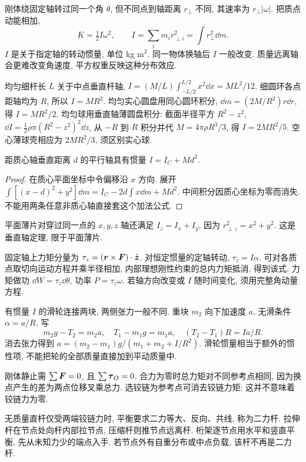\label{ch:rotation}
刚体绕固定轴转过同一个角 $\theta$, 但不同点到轴距离 $r_\perp$ 不同, 其速率为 $r_\perp|\omega|$. 把质点动能相加,
\begin{equation}
K=\tfrac12 I\omega^2,\qquad I=\sum_i m_ir_{\perp i}^2=\int r_\perp^2\dd m.
\end{equation}
$I$ 是关于指定轴的转动惯量, 单位 kg m$^2$. 同一物体换轴后 $I$ 一般改变. 质量远离轴会更难改变角速度, 平方权重反映这种分布效应.

均匀细杆长 $L$ 关于中点垂直杆轴, $I=(M/L)\int_{-L/2}^{L/2}x^2\dd x=ML^2/12$. 细圆环各点距轴均为 $R$, 所以 $I=MR^2$. 均匀实心圆盘用同心圆环积分, $\dd m=(2M/R^2)r\dd r$, 得 $I=MR^2/2$. 均匀球用垂直轴薄圆盘积分: 截面半径平方 $R^2-z^2$, $\dd I=\frac12\rho\pi(R^2-z^2)^2\dd z$, 从 $-R$ 到 $R$ 积分并代 $M=4\pi\rho R^3/3$, 得 $I=2MR^2/5$. 空心薄球壳相应为 $2MR^2/3$, 须区别实心球.

\begin{theorem}[平行轴定理]
距质心轴垂直距离 $d$ 的平行轴具有惯量 $I=I_C+Md^2$.
\end{theorem}
\begin{proof}
在质心平面坐标中令偏移沿 $x$ 方向. 展开 $\int[(x-d)^2+y^2]\dd m=I_C-2d\int x\dd m+Md^2$. 中间积分因质心坐标为零而消失. 不能用两条任意非质心轴直接套这个加法公式.
\end{proof}
平面薄片对穿过同一点的 $x,y,z$ 轴还满足 $I_z=I_x+I_y$, 因为 $r_{\perp z}^2=x^2+y^2$. 这是垂直轴定理, 限于平面薄片.

固定轴上力矩分量为 $\tau_z=(\boldsymbol{r}\times\boldsymbol{F})\cdot\hat{\boldsymbol{z}}$. 对恒定惯量的定轴转动, $\tau_z=I\alpha$. 可对各质点取切向运动方程并乘半径相加, 内部理想刚性约束的总内力矩抵消, 得到该式. 力矩做功 $\dd W=\tau_z\dd\theta$, 功率 $P=\tau_z\omega$. 若轴方向改变或 $I$ 随时间变化, 须用完整角动量方程.

有惯量 $I$ 的滑轮连接两块, 两侧张力一般不同. 重块 $m_2$ 向下加速度 $a$, 无滑条件 $\alpha=a/R$, 写
\begin{equation}
m_2g-T_2=m_2a,\quad T_1-m_1g=m_1a,\quad
(T_2-T_1)R=I a/R.
\end{equation}
消去张力得到 $a=(m_2-m_1)g/(m_1+m_2+I/R^2)$. 滑轮惯量相当于额外的惯性项, 不能把轮的全部质量直接加到平动质量中.

刚体静止需 $\sum\boldsymbol{F}=0$, 且 $\sum\boldsymbol{\tau}_O=0$. 合力为零时总力矩对不同参考点相同, 因为换点产生的差为两点位移叉乘总力. 选铰链为参考点可消去铰链力矩; 这并不意味着铰链力为零.

无质量直杆仅受两端铰链力时, 平衡要求二力等大、反向、共线, 称为二力杆. 拉伸杆在节点处向杆内部拉节点, 压缩杆则推节点远离杆. 桁架逐节点用水平和竖直平衡, 先从未知力少的端点入手. 若节点外有自重分布或中点负载, 该杆不再是二力杆.

